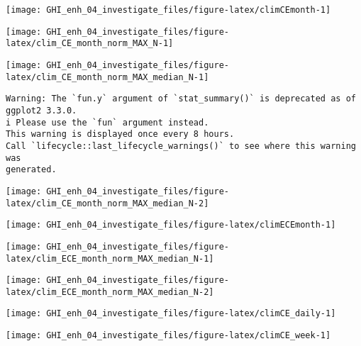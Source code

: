 \documentclass[
  10pt,
  a4paper,oneside]{article}
\begin{document}
\begin{center}\texttt{[image: GHI\_enh\_04\_investigate\_files/figure-latex/climCEmonth-1]} \end{center}

\begin{center}\texttt{[image: GHI\_enh\_04\_investigate\_files/figure-latex/clim\_CE\_month\_norm\_MAX\_N-1]} \end{center}

\begin{center}\texttt{[image: GHI\_enh\_04\_investigate\_files/figure-latex/clim\_CE\_month\_norm\_MAX\_median\_N-1]} \end{center}

\begin{verbatim}
Warning: The `fun.y` argument of `stat_summary()` is deprecated as of ggplot2 3.3.0.
i Please use the `fun` argument instead.
This warning is displayed once every 8 hours.
Call `lifecycle::last_lifecycle_warnings()` to see where this warning was
generated.
\end{verbatim}

\begin{center}\texttt{[image: GHI\_enh\_04\_investigate\_files/figure-latex/clim\_CE\_month\_norm\_MAX\_median\_N-2]} \end{center}

\begin{center}\texttt{[image: GHI\_enh\_04\_investigate\_files/figure-latex/climECEmonth-1]} \end{center}

\begin{center}\texttt{[image: GHI\_enh\_04\_investigate\_files/figure-latex/clim\_ECE\_month\_norm\_MAX\_median\_N-1]} \end{center}

\begin{center}\texttt{[image: GHI\_enh\_04\_investigate\_files/figure-latex/clim\_ECE\_month\_norm\_MAX\_median\_N-2]} \end{center}

\begin{center}\texttt{[image: GHI\_enh\_04\_investigate\_files/figure-latex/climCE\_daily-1]} \end{center}

\begin{center}\texttt{[image: GHI\_enh\_04\_investigate\_files/figure-latex/climCE\_week-1]} \end{center}
\end{document}
